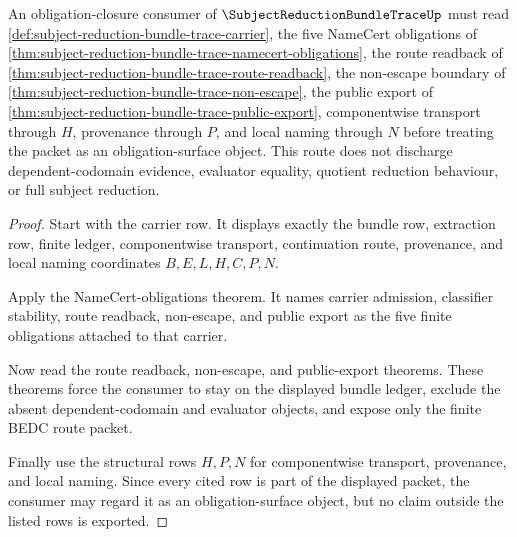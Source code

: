 \begin{theorem}
\label{thm:subject-reduction-bundle-trace-obligation-route}
An obligation-closure consumer of $\SubjectReductionBundleTraceUp$ must read
\autoref{def:subject-reduction-bundle-trace-carrier}, the five NameCert
obligations of
\autoref{thm:subject-reduction-bundle-trace-namecert-obligations}, the route
readback of \autoref{thm:subject-reduction-bundle-trace-route-readback}, the
non-escape boundary of
\autoref{thm:subject-reduction-bundle-trace-non-escape}, the public export of
\autoref{thm:subject-reduction-bundle-trace-public-export}, componentwise
transport through $H$, provenance through $P$, and local naming through $N$
before treating the packet as an obligation-surface object. This route does
not discharge dependent-codomain evidence, evaluator equality, quotient
reduction behaviour, or full subject reduction.
\end{theorem}
\begin{proof}
Start with the carrier row. It displays exactly the bundle row, extraction
row, finite ledger, componentwise transport, continuation route, provenance,
and local naming coordinates $B,E,L,H,C,P,N$.

Apply the NameCert-obligations theorem. It names carrier admission,
classifier stability, route readback, non-escape, and public export as the
five finite obligations attached to that carrier.

Now read the route readback, non-escape, and public-export theorems. These
theorems force the consumer to stay on the displayed bundle ledger, exclude
the absent dependent-codomain and evaluator objects, and expose only the
finite BEDC route packet.

Finally use the structural rows $H,P,N$ for componentwise transport,
provenance, and local naming. Since every cited row is part of the displayed
packet, the consumer may regard it as an obligation-surface object, but no
claim outside the listed rows is exported.
\end{proof}


